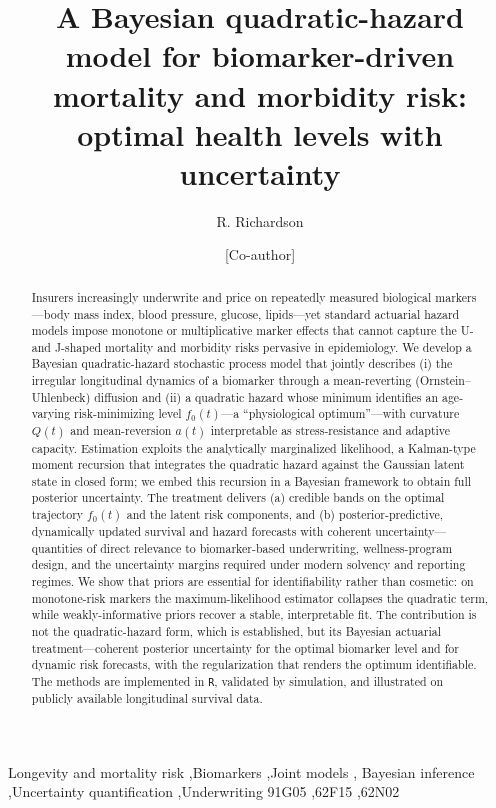 \documentclass[review,3p,times]{elsarticle}
\newcommand{\fzero}{f_0}
\begin{document}
\begin{frontmatter}

\title{A Bayesian quadratic-hazard model for biomarker-driven mortality
and morbidity risk: optimal health levels with uncertainty}

\author[byu]{R. Richardson}
\author[bio]{[Co-author]}
\address[byu]{Department of Statistics, Brigham Young University, Provo, UT, USA}
\address[bio]{[Department], Brigham Young University, Provo, UT, USA}

\begin{abstract}
Insurers increasingly underwrite and price on repeatedly measured biological
markers---body mass index, blood pressure, glucose, lipids---yet standard
actuarial hazard models impose monotone or multiplicative marker effects that
cannot capture the U- and J-shaped mortality and morbidity risks pervasive in
epidemiology. We develop a Bayesian quadratic-hazard stochastic process model
that jointly describes (i) the irregular longitudinal dynamics of a biomarker
through a mean-reverting (Ornstein--Uhlenbeck) diffusion and (ii) a quadratic
hazard whose minimum identifies an age-varying risk-minimizing level
$\fzero(t)$---a ``physiological optimum''---with curvature $Q(t)$ and
mean-reversion $a(t)$ interpretable as stress-resistance and adaptive capacity.
Estimation exploits the analytically marginalized likelihood, a Kalman-type
moment recursion that integrates the quadratic hazard against the Gaussian latent
state in closed form; we embed this recursion in a Bayesian framework to obtain
full posterior uncertainty. The treatment delivers (a) credible bands on the
optimal trajectory $\fzero(t)$ and the latent risk components, and (b)
posterior-predictive, dynamically updated survival and hazard forecasts with
coherent uncertainty---quantities of direct relevance to biomarker-based
underwriting, wellness-program design, and the uncertainty margins required under
modern solvency and reporting regimes. We show that priors are essential for
identifiability rather than cosmetic: on monotone-risk markers the
maximum-likelihood estimator collapses the quadratic term, while
weakly-informative priors recover a stable, interpretable fit. The contribution is
not the quadratic-hazard form, which is established, but its Bayesian actuarial
treatment---coherent posterior uncertainty for the optimal biomarker level and for
dynamic risk forecasts, with the regularization that renders the optimum
identifiable. The methods are implemented in \texttt{R}, validated by simulation,
and illustrated on publicly available longitudinal survival data.
\end{abstract}

\begin{keyword}
Longevity and mortality risk \sep Biomarkers \sep Joint models \sep
Bayesian inference \sep Uncertainty quantification \sep Underwriting
\MSC[2020] 91G05 \sep 62F15 \sep 62N02
\end{keyword}

\end{frontmatter}
\end{document}
